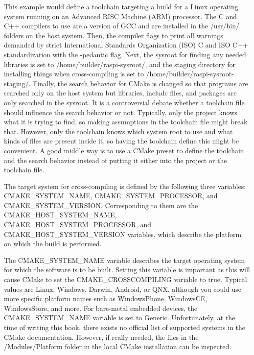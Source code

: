 This example would define a toolchain targeting a build for a Linux operating system
running on an Advanced RISC Machine (ARM) processor. The C and C++ compilers to use are a version of GCC and are installed in the /usr/bin/ folders on the host system. Then, the compiler flags to print all warnings demanded by strict International Standards Organization (ISO) C and ISO C++ standardization with the -pedantic flag. Next, the sysroot for finding any needed libraries is set to /home/builder/raspi-sysroot/, and the staging directory for installing things when cross-compiling is set to /home/builder/raspi-sysroot-staging/. Finally, the search behavior for CMake is changed so that programs are searched only on the host system but libraries, include files, and packages are only searched in the sysroot. It is a controversial debate whether a toolchain file should influence the search behavior or not. Typically, only the project knows what it is trying to find, so making assumptions in the toolchain file might break that. However, only the toolchain knows which system root to use and what kinds of files are present inside it, so having the toolchain define this might be convenient. A good middle way is to use a CMake preset to define the toolchain and the search behavior instead of putting it either into the project or the toolchain file.


The target system for cross-compiling is defined by the following three variables: CMAKE\_SYSTEM\_NAME, CMAKE\_SYSTEM\_PROCESSOR, and CMAKE\_SYSTEM\_VERSION. Corresponding to them are the CMAKE\_HOST\_SYSTEM\_NAME, CMAKE\_HOST\_SYSTEM\_PROCESSOR, and CMAKE\_HOST\_SYSTEM\_VERSION variables, which describe the platform on which the build is performed.
 
The CMAKE\_SYSTEM\_NAME variable describes the target operating system for which the software is to be built. Setting this variable is important as this will cause CMake to set the CMAKE\_CROSSCOMPILING variable to true. Typical values are Linux, Windows, Darwin, Android, or QNX, although you could use more specific platform names such as WindowsPhone, WindowsCE, WindowsStore, and more. For bare-metal embedded devices, the CMAKE\_SYSTEM\_NAME variable is set to Generic. Unfortunately, at the time of writing this book, there exists no official list of supported systems in the CMake documentation. However, if really needed, the files in the /Modules/Platform folder in the local CMake installation can be inspected.

